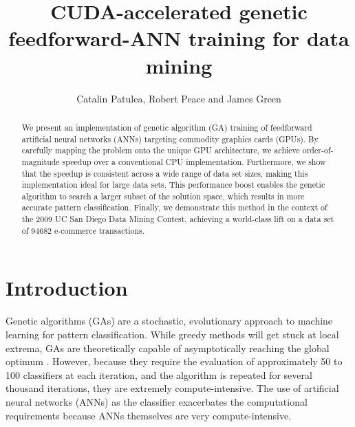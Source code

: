\documentclass[letterpaper]{jpconf}       %
\begin{document}


\title{CUDA-accelerated genetic feedforward-ANN training for data mining}


\author{Catalin Patulea, Robert Peace and James Green}
\address{School of Systems and Computer Engineering,
Carleton University,
Ottawa, Canada K1S 5B6}

\begin{abstract}
We present an implementation of genetic algorithm (GA) training of feedforward artificial neural networks (ANNs) targeting commodity graphics cards (GPUs). By carefully mapping the problem onto the unique GPU architecture, we achieve order-of-magnitude speedup over a conventional CPU implementation. Furthermore, we show that the speedup is consistent across a wide range of data set sizes, making this implementation ideal for large data sets. This performance boost enables the genetic algorithm to search a larger subset of the solution space, which results in more accurate pattern classification. Finally, we demonstrate this method in the context of the 2009 UC San Diego Data Mining Contest, achieving a world-class lift on a data set of 94682 e-commerce transactions.
\end{abstract}

\section{Introduction} \label{intro}
Genetic algorithms (GAs) are a stochastic, evolutionary approach to machine learning for pattern classification. While greedy methods will get stuck at local extrema, GAs  are theoretically capable of asymptotically reaching the global optimum \cite{GA-ANN}. However, because they require the evaluation of approximately 50 to 100 classifiers at each iteration, and the algorithm is repeated for several thousand iterations, they are extremely compute-intensive. The use of artificial neural networks (ANNs) as the classifier exacerbates the computational requirements because ANNs themselves are very compute-intensive.
\end{document}
